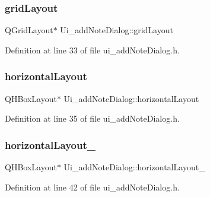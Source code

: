 \hypertarget{classUi__addNoteDialog_a8e3a587de2697e28e5c06232ae12a27f}{}\label{classUi__addNoteDialog_a8e3a587de2697e28e5c06232ae12a27f} 
\subsubsection{\texorpdfstring{grid\+Layout}{gridLayout}}
{\footnotesize\ttfamily Q\+Grid\+Layout$\ast$ Ui\+\_\+add\+Note\+Dialog\+::grid\+Layout}



Definition at line 33 of file ui\+\_\+add\+Note\+Dialog.\+h.

\hypertarget{classUi__addNoteDialog_aee7483b969d780e610d025a38849298c}{}\label{classUi__addNoteDialog_aee7483b969d780e610d025a38849298c} 
\subsubsection{\texorpdfstring{horizontal\+Layout}{horizontalLayout}}
{\footnotesize\ttfamily Q\+H\+Box\+Layout$\ast$ Ui\+\_\+add\+Note\+Dialog\+::horizontal\+Layout}



Definition at line 35 of file ui\+\_\+add\+Note\+Dialog.\+h.

\hypertarget{classUi__addNoteDialog_a887453602e2364b3972cf6b0512210c9}{}\label{classUi__addNoteDialog_a887453602e2364b3972cf6b0512210c9} 
\subsubsection{\texorpdfstring{horizontal\+Layout\+\_}{horizontalLayout\_5}}
{\footnotesize\ttfamily Q\+H\+Box\+Layout$\ast$ Ui\+\_\+add\+Note\+Dialog\+::horizontal\+Layout\+\_}



Definition at line 42 of file ui\+\_\+add\+Note\+Dialog.\+h.

\hypertarget{classUi__addNoteDialog_a5c9351b134e471dcf8256461f2e5edb3}{}\label{classUi__addNoteDialog_a5c9351b134e471dcf8256461f2e5edb3} 
